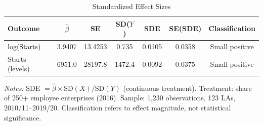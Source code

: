\begin{table}[htbp]
\centering
\caption{Standardized Effect Sizes}
\label{tab:sde}
\begin{tabular}{lcccccc}
\hline\hline
Outcome & $\hat{\beta}$ & SE & SD($Y$) & SDE & SE(SDE) & Classification \\
\hline
log(Starts) & 3.9407 & 13.4253 & 0.735 & 0.0105 & 0.0358 & Small positive \\
Starts (levels) & 6951.0 & 28197.8 & 1472.4 & 0.0092 & 0.0375 & Small positive \\
\hline\hline
\end{tabular}
\begin{tablenotes}\small
\item \textit{Notes:} SDE $= \hat{\beta} \times \text{SD}(X) / \text{SD}(Y)$ (continuous treatment). Treatment: share of 250+ employee enterprises (2016). Sample: 1,230 observations, 123 LAs, 2010/11--2019/20. Classification refers to effect magnitude, not statistical significance.
\end{tablenotes}
\end{table}

